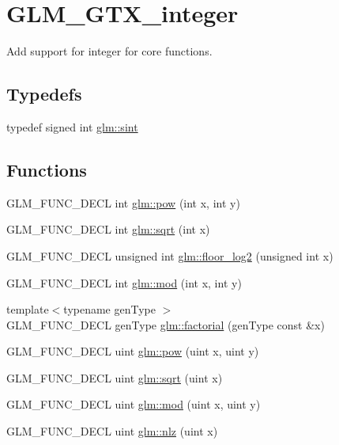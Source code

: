 \hypertarget{group__gtx__integer}{\section{G\-L\-M\-\_\-\-G\-T\-X\-\_\-integer}
\label{group__gtx__integer}
}


Add support for integer for core functions.  


\subsection*{Typedefs}
\begin{DoxyCompactItemize}
\item 
typedef signed int \hyperlink{group__gtx__integer_ga73643e09d8c6d362418aec541fdb987d}{glm\-::sint}
\end{DoxyCompactItemize}
\subsection*{Functions}
\begin{DoxyCompactItemize}
\item 
G\-L\-M\-\_\-\-F\-U\-N\-C\-\_\-\-D\-E\-C\-L int \hyperlink{group__gtx__integer_ga9642514a44a67afa70966d756f040ca9}{glm\-::pow} (int x, int y)
\item 
G\-L\-M\-\_\-\-F\-U\-N\-C\-\_\-\-D\-E\-C\-L int \hyperlink{group__gtx__integer_ga78e2e68330e91d350fcfc2f4831cad12}{glm\-::sqrt} (int x)
\item 
G\-L\-M\-\_\-\-F\-U\-N\-C\-\_\-\-D\-E\-C\-L unsigned int \hyperlink{group__gtx__integer_ga7011b4e1c1e1ed492149b028feacc00e}{glm\-::floor\-\_\-log2} (unsigned int x)
\item 
G\-L\-M\-\_\-\-F\-U\-N\-C\-\_\-\-D\-E\-C\-L int \hyperlink{group__gtx__integer_gab9d22df91aac4d9eb925a4910f556f1b}{glm\-::mod} (int x, int y)
\item 
{\footnotesize template$<$typename gen\-Type $>$ }\\G\-L\-M\-\_\-\-F\-U\-N\-C\-\_\-\-D\-E\-C\-L gen\-Type \hyperlink{group__gtx__integer_ga8cbd3120905f398ec321b5d1836e08fb}{glm\-::factorial} (gen\-Type const \&x)
\item 
G\-L\-M\-\_\-\-F\-U\-N\-C\-\_\-\-D\-E\-C\-L uint \hyperlink{group__gtx__integer_gaa8229e850c3cc4ad83492fe390ada044}{glm\-::pow} (uint x, uint y)
\item 
G\-L\-M\-\_\-\-F\-U\-N\-C\-\_\-\-D\-E\-C\-L uint \hyperlink{group__gtx__integer_ga457e9efca8339bf918d319e9c55f7c8f}{glm\-::sqrt} (uint x)
\item 
G\-L\-M\-\_\-\-F\-U\-N\-C\-\_\-\-D\-E\-C\-L uint \hyperlink{group__gtx__integer_gab8f9ec0ca93ca90669434224818f0750}{glm\-::mod} (uint x, uint y)
\item 
G\-L\-M\-\_\-\-F\-U\-N\-C\-\_\-\-D\-E\-C\-L uint \hyperlink{group__gtx__integer_gacbe62fd2384464c16ea30ecc4defc11c}{glm\-::nlz} (uint x)
\end{DoxyCompactItemize}



